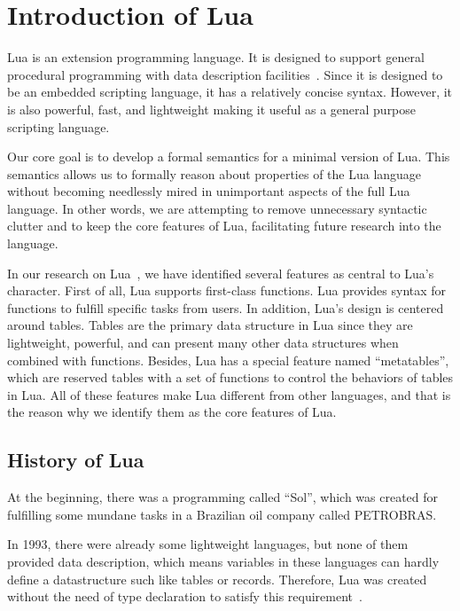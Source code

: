 \chapter{Introduction of Lua}
Lua is an extension programming language. It is designed to support general procedural programming with data description facilities~\cite{EEL}. Since it is designed to be an embedded scripting language, it has a relatively concise syntax. However, it is also powerful, fast, and lightweight making it useful as a general purpose scripting language.

Our core goal is to develop a formal semantics for a minimal version of Lua. This semantics allows us to formally reason about properties of the Lua language without becoming needlessly mired in unimportant aspects of the full Lua language. In other words, we are attempting to remove unnecessary syntactic clutter and to keep the core features of Lua, facilitating future research into the language.


In our research on Lua~\cite{LRM}, we have identified several features as central to Lua's character. First of all, Lua supports first-class functions. Lua provides syntax for functions to fulfill specific tasks from users. In addition, Lua's design is centered around tables. Tables are the primary data structure in Lua since they are lightweight, powerful, and can present many other data structures when combined with functions. Besides, Lua has a special feature named ``metatables'', which are reserved tables with a set of functions to control the behaviors of tables in Lua. All of these features make Lua different from other languages, and that is the reason why we identify them as the core features of Lua.

\section{History of Lua}
At the beginning, there was a programming called ``Sol'', which was created for fulfilling some mundane tasks in a Brazilian oil company called PETROBRAS. 

In 1993, there were already some lightweight languages, but
none of them provided data description, which means variables in these languages can hardly define a datastructure such like tables or records. Therefore, Lua was created without the need of type declaration to satisfy this requirement~\cite{EOL}.

